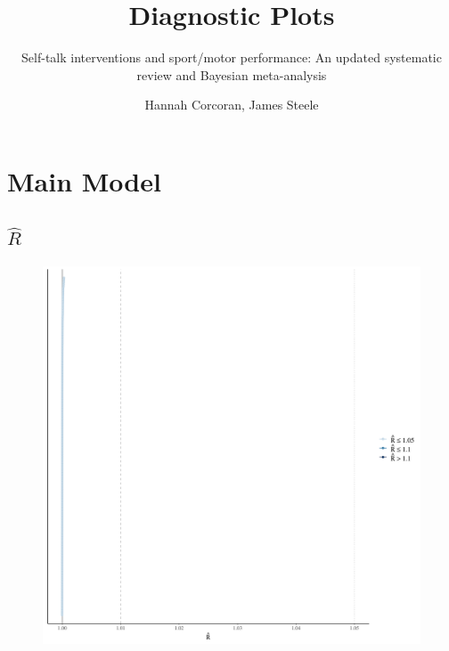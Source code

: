 \documentclass[
]{report}
\title{Diagnostic Plots}
\subtitle{Self-talk interventions and sport/motor performance: An
updated systematic review and Bayesian meta-analysis}
\author{Hannah Corcoran, James Steele}
\date{}
\begin{document}
\maketitle
\ifdefined\Shaded\renewenvironment{Shaded}{\begin{tcolorbox}[enhanced, interior hidden, boxrule=0pt, borderline west={3pt}{0pt}{shadecolor}, breakable, sharp corners, frame hidden]}{\end{tcolorbox}}\fi

\hypertarget{main-model}{%
\chapter{Main Model}\label{main-model}}

\hypertarget{hatr}{%
\section{\texorpdfstring{\(\hat{R}\)}{\textbackslash hat\{R\}}}\label{hatr}}

\begin{figure}

{\centering \includegraphics[width=1\textwidth,height=\textheight]{diagnostic_plots_files/figure-pdf/unnamed-chunk-1-1.pdf}

}

\end{figure}
\end{document}
